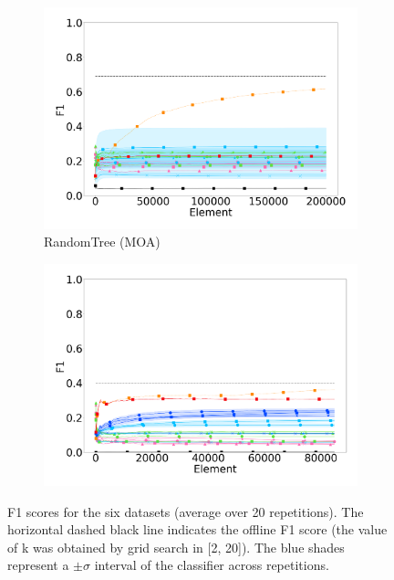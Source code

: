 \begin{figure}
\begin{subfigure}[t]{.49\linewidth}
		\includegraphics[width=\linewidth]{figures/results/dataset_3_f1_std.png}
		\caption{RandomTree (MOA)}
		\label{fig:f1-dataset_3}
	\end{subfigure}
	\begin{subfigure}[t]{.49\linewidth}
		\includegraphics[width=\linewidth]{figures/results/recofit_6_f1_std.png}
		\caption{\recofitdataset}
		\label{fig:f1-recofit}
	\end{subfigure}
		\vskip 0.1cm
	\caption{F1 scores for the six datasets (average over 20 repetitions).
		The horizontal dashed black line indicates the offline \knn F1
		score (the value of k was obtained by grid search in [2, 20]). The
		blue shades represent a $\pm\sigma$ interval of the \mondrianforest
		classifier across repetitions.}
	\label{fig:f1}
\end{figure}

